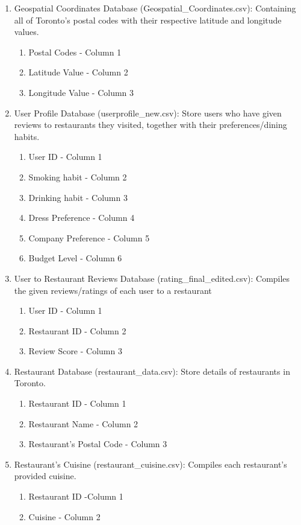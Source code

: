\documentclass{article}
\begin{document}
\begin{enumerate}
    \item Geospatial Coordinates Database (Geospatial\_Coordinates.csv):
Containing all of Toronto’s postal codes with their respective latitude and longitude values.
    \begin{enumerate}
        \item Postal Codes - Column 1
        \item Latitude Value - Column 2
        \item Longitude Value - Column 3
    \end{enumerate}
    \item User Profile Database (userprofile\_new.csv):
Store users who have given reviews to restaurants they visited, together with their preferences/dining habits.
    \begin{enumerate}
        \item User ID - Column 1
        \item Smoking habit - Column 2
        \item Drinking habit - Column 3
        \item Dress Preference - Column 4
        \item Company Preference - Column 5
        \item Budget Level - Column 6
    \end{enumerate}
    \item User to Restaurant Reviews Database (rating\_final\_edited.csv):
	Compiles the  given reviews/ratings of each user to a restaurant
    \begin{enumerate}
        \item User ID - Column 1
        \item Restaurant ID - Column 2
        \item Review Score - Column 3
    \end{enumerate}
    \item Restaurant Database (restaurant\_data.csv):
    Store details of restaurants in Toronto.
    \begin{enumerate}
        \item Restaurant ID - Column 1
        \item Restaurant Name - Column 2
        \item Restaurant’s Postal Code - Column 3
    \end{enumerate}
    \item Restaurant’s Cuisine (restaurant\_cuisine.csv):
	Compiles each restaurant’s provided cuisine. 
    \begin{enumerate}
        \item Restaurant ID -Column 1
        \item Cuisine - Column 2
    \end{enumerate}
\end{enumerate}
\end{document}
